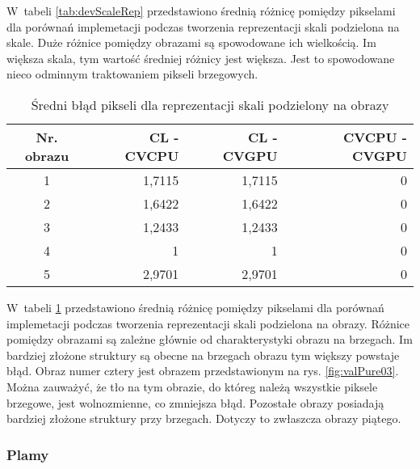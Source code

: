 W~tabeli \ref{tab:devScaleRep} przedstawiono średnią różnicę pomiędzy pikselami dla porównań implemetacji podczas tworzenia reprezentacji skali podzielona na skale. Duże różnice pomiędzy obrazami są spowodowane ich wielkością. Im większa skala, tym wartość średniej różnicy jest większa. Jest to spowodowane nieco odminnym traktowaniem pikseli brzegowych. 

\begin{center}
\begin{table}
\centering
\caption{Średni błąd pikseli dla reprezentacji skali podzielony na obrazy}
\label{tab:devImageRep}
\begin{tabular}{|c|r|r|r|}
\hline
Nr. obrazu & CL - CVCPU & CL - CVGPU & CVCPU - CVGPU \\ \hline
1 & 1,7115 & 1,7115 & 0 \\ \hline
2 & 1,6422 & 1,6422 & 0 \\ \hline
3 & 1,2433 & 1,2433 & 0 \\ \hline
4 & 1 & 1 & 0 \\ \hline
5 & 2,9701 & 2,9701 & 0 \\ \hline
\end{tabular}
\end{table}
\end{center}

W~tabeli \ref{tab:devImageRep} przedstawiono średnią różnicę pomiędzy pikselami dla porównań implemetacji podczas tworzenia reprezentacji skali podzielona na obrazy. Różnice pomiędzy obrazami są zależne głównie od charakterystyki obrazu na brzegach. Im bardziej złożone struktury są obecne na brzegach obrazu tym większy powstaje błąd. Obraz numer cztery jest obrazem przedstawionym na rys. \ref{fig:valPure03}. Można zauważyć, że tło na tym obrazie, do któreg należą wszystkie piksele brzegowe, jest wolnozmienne, co zmniejsza błąd. Pozostałe obrazy posiadają bardziej złożone struktury przy brzegach. Dotyczy to zwłaszcza obrazy piątego.

\subsubsection{Plamy}
\label{subsubsec:plamyTabele}

